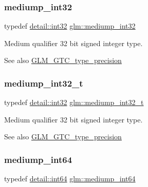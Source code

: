 \subsubsection{\texorpdfstring{mediump\+\_\+int32}{mediump\_int32}}
{\footnotesize\ttfamily typedef \mbox{\hyperlink{namespaceglm_1_1detail_a9f85b4efeca416cdcec2fd08939a2e17}{detail\+::int32}} \mbox{\hyperlink{group__gtc__type__precision_ga0660a752402702f420f13c686a7fff29}{glm\+::mediump\+\_\+int32}}}

Medium qualifier 32 bit signed integer type. \begin{DoxySeeAlso}{See also}
\mbox{\hyperlink{group__gtc__type__precision}{G\+L\+M\+\_\+\+G\+T\+C\+\_\+type\+\_\+precision}} 
\end{DoxySeeAlso}
\mbox{\label{group__gtc__type__precision_gafd9b4bd9e4465aec63351b59100692c4}} 
\subsubsection{\texorpdfstring{mediump\+\_\+int32\+\_\+t}{mediump\_int32\_t}}
{\footnotesize\ttfamily typedef \mbox{\hyperlink{namespaceglm_1_1detail_a9f85b4efeca416cdcec2fd08939a2e17}{detail\+::int32}} \mbox{\hyperlink{group__gtc__type__precision_gafd9b4bd9e4465aec63351b59100692c4}{glm\+::mediump\+\_\+int32\+\_\+t}}}

Medium qualifier 32 bit signed integer type. \begin{DoxySeeAlso}{See also}
\mbox{\hyperlink{group__gtc__type__precision}{G\+L\+M\+\_\+\+G\+T\+C\+\_\+type\+\_\+precision}} 
\end{DoxySeeAlso}
\mbox{\label{group__gtc__type__precision_ga603c695fe5cd677d3f72a81343e19a74}} 
\subsubsection{\texorpdfstring{mediump\+\_\+int64}{mediump\_int64}}
{\footnotesize\ttfamily typedef \mbox{\hyperlink{namespaceglm_1_1detail_a5b1c3227ec636c24a0676746381adfc8}{detail\+::int64}} \mbox{\hyperlink{group__gtc__type__precision_ga603c695fe5cd677d3f72a81343e19a74}{glm\+::mediump\+\_\+int64}}}


